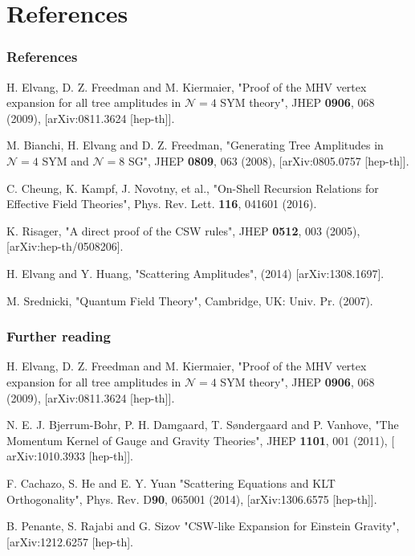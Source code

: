 \documentclass{beamer}[10]
\begin{document}
\section{References}
\begin{frame}
\frametitle{References}
\begin{enumerate}
	\small{\item H. Elvang, D. Z. Freedman and M. Kiermaier,
	"Proof of the MHV vertex expansion for all tree amplitudes in $\mathcal{N}=4$ SYM theory",
	JHEP \textbf{0906}, 068 (2009), [arXiv:0811.3624 [hep-th]].
	\item M. Bianchi, H. Elvang and D. Z. Freedman,
	"Generating Tree Amplitudes in $\mathcal{N}=4$ SYM and $\mathcal{N}=8$ SG", JHEP \textbf{0809}, 063 (2008), [arXiv:0805.0757 [hep-th]].
	\item C. Cheung, K. Kampf, J. Novotny, et al.,
	"On-Shell Recursion Relations for Effective Field Theories",
	Phys. Rev. Lett. \textbf{116}, 041601 (2016).
	\item K. Risager, "A direct proof of the CSW rules", JHEP \textbf{0512}, 003 (2005), [arXiv:hep-th/0508206].
	\item H. Elvang and Y. Huang, "Scattering Amplitudes", (2014) [arXiv:1308.1697].
	\item M. Srednicki, "Quantum Field Theory", Cambridge, UK: Univ. Pr. (2007).}
	
\end{enumerate}
\end{frame}
\begin{frame}
\frametitle{Further reading}
\begin{enumerate}
	\setcounter{enumi}{7}
	\small{\item
		H. Elvang, D. Z. Freedman and M. Kiermaier,
		"Proof of the MHV vertex expansion for all tree amplitudes in $\mathcal{N}=4$ SYM theory",
		JHEP \textbf{0906}, 068 (2009), [arXiv:0811.3624 [hep-th]].
		\item N. E. J. Bjerrum-Bohr, P. H. Damgaard, T. Søndergaard and P. Vanhove, "The Momentum Kernel of Gauge and Gravity Theories", JHEP \textbf{1101}, 001 (2011), [ 	arXiv:1010.3933 [hep-th]].
	\item F. Cachazo, S. He and E. Y. Yuan "Scattering Equations and KLT Orthogonality", Phys. Rev. D\textbf{90}, 065001 (2014), [arXiv:1306.6575 [hep-th]].
	\item B. Penante, S. Rajabi and G. Sizov "CSW-like Expansion for Einstein Gravity", [arXiv:1212.6257 [hep-th].}
\end{enumerate}
\end{frame}
\end{document}
